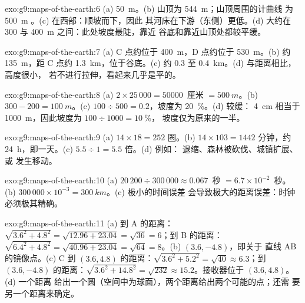 \begin{solution}{exo:g9:maps-of-the-earth:6}
(a) \qty{50}{m}。(b) 山顶为 \qty{544}{m}；山顶周围的计曲线
为 \qty{500}{m} 。(c) 在西部：顺坡而下，因此
其河床在下游（东侧）更低。(d) 大约在 300 与
\qty{400}{m} 之间：此处坡度最陡，靠近
谷底和靠近山顶处都较平缓。
\end{solution}

\begin{solution}{exo:g9:maps-of-the-earth:7}
(a) C 点约位于 \qty{400}{m}，D 点约位于 \qty{530}{m}。(b) 约
\qty{135}{m}，距 C 点约 \qty{1.3}{km}，位于谷底。(c) 约
0.3 至 \qty{0.4}{km}。(d) 与距离相比，高度很小，
若不进行拉伸，看起来几乎是平的。
\end{solution}

\begin{solution}{exo:g9:maps-of-the-earth:8}
(a) $2 \times 25\,000 = \num{50000}$~厘米 $= \qty{500}{m}$。(b) $300 - 200 =
\qty{100}{m}$。(c) $100 \div 500 = 0.2$，坡度为 \qty{20}{\%}。(d) 较缓：
\qty{4}{cm} 相当于 \qty{1000}{m}，因此坡度为 $100 \div 1000 = \qty{10}{\%}$，
坡度仅为原来的一半。
\end{solution}

\begin{solution}{exo:g9:maps-of-the-earth:9}
(a) $14 \times 18 = 252$ 圈。(b) $14 \times 103 = 1442$ 分钟，约
\qty{24}{h}，即一天。(c) $5.5 \div 1 = 5.5$ 倍。(d) 例如：
退缩、森林被砍伐、城镇扩展、或
发生移动。
\end{solution}

\begin{solution}{exo:g9:maps-of-the-earth:10}
(a) $20\,200 \div 300\,000 \approx 0.067$~秒 $= 6.7 \times 10^{-2}$~秒。
(b) $300\,000 \times 10^{-3} = \qty{300}{km}$。(c) 极小的时间误差
会导致极大的距离误差：时钟必须极其精确。
\end{solution}

\begin{solution}{exo:g9:maps-of-the-earth:11}
(a) 到 A 的距离：$\sqrt{3.6^2 + 4.8^2} = \sqrt{12.96 + 23.04} =
\sqrt{36} = 6$；到 B 的距离：$\sqrt{6.4^2 + 4.8^2} = \sqrt{40.96 +
23.04} = \sqrt{64} = 8$。(b) $(3.6, -4.8)$，即关于
直线 AB 的镜像点。(c) C 到 $(3.6, 4.8)$ 的距离：$\sqrt{3.6^2 + 5.2^2} =
\sqrt{40} \approx 6.3$；到 $(3.6, -4.8)$ 的距离：$\sqrt{3.6^2 + 14.8^2} =
\sqrt{232} \approx 15.2$。接收器位于 $(3.6, 4.8)$。(d) 一个距离
给出一个圆（空间中为球面），两个距离给出两个可能的点；还需
要另一个距离来确定。
\end{solution}

